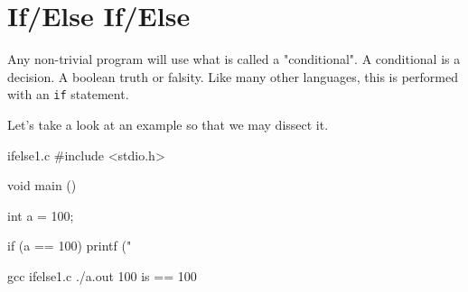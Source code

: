 \chapter{If/Else If/Else}

Any non-trivial program will use what is called a "conditional". A conditional
is a decision. A boolean truth or falsity. Like many other languages, this is
performed with an \verb|if| statement.

Let's take a look at an example so that we may dissect it.

\begin{code}{ifelse1.c}
#include <stdio.h>

void main ()
{
    int a = 100;

    if (a == 100) {
        printf ("%
    }
}
\end{code}

\begin{Terminal}
gcc ifelse1.c
./a.out
100 is == 100
\end{Terminal}
